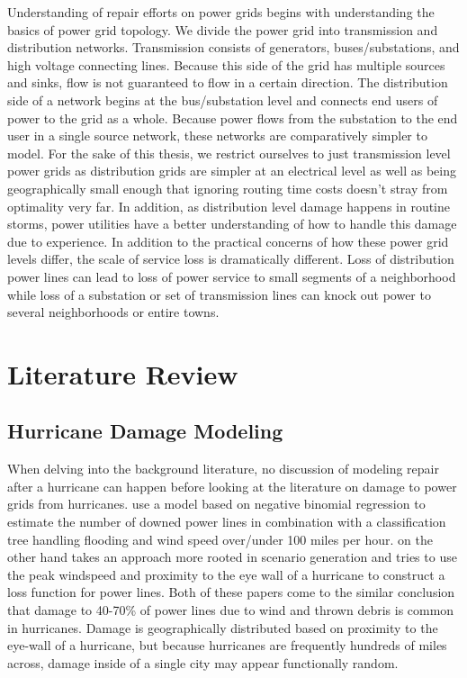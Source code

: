 \documentclass{article}
\begin{document}
	Understanding of repair efforts on power grids begins with understanding the basics of power grid topology. We divide the power grid into transmission and distribution networks. Transmission consists of generators, buses/substations, and high voltage connecting lines. Because this side of the grid has multiple sources and sinks, flow is not guaranteed to flow in a certain direction. The distribution side of a network begins at the bus/substation level and connects end users of power to the grid as a whole. Because power flows from the substation to the end user in a single source network, these networks are comparatively simpler to model. For the sake of this thesis, we restrict ourselves to just transmission level power grids as distribution grids are simpler at an electrical level as well as being geographically small enough that ignoring routing time costs doesn't stray from optimality very far. In addition, as distribution level damage happens in routine storms, power utilities have a better understanding of how to handle this damage due to experience. In addition to the practical concerns of how these power grid levels differ, the scale of service loss is dramatically different. Loss of distribution power lines can lead to loss of power service to small segments of a neighborhood while loss of a substation or set of transmission lines can knock out power to several neighborhoods or entire towns.
	
	
	\section{Literature Review}
	\subsection{Hurricane Damage Modeling}
		When delving into the background literature, no discussion of modeling repair after a hurricane can happen before looking at the literature on damage to power grids from hurricanes. \cite{GuikemaEA2010} use a model based on negative binomial regression to estimate the number of downed power lines in combination with a classification tree handling flooding and wind speed over/under 100 miles per hour. \cite{ScherbEA2015} on the other hand takes an approach more rooted in scenario generation and tries to use the peak windspeed and proximity to the eye wall of a hurricane to construct a loss function for power lines. Both of these papers come to the similar conclusion that damage to 40-70\% of power lines due to wind and thrown debris is common in hurricanes. Damage is geographically distributed based on proximity to the eye-wall of a hurricane, but because hurricanes are frequently hundreds of miles across, damage inside of a single city may appear functionally random. 
		
\end{document}
